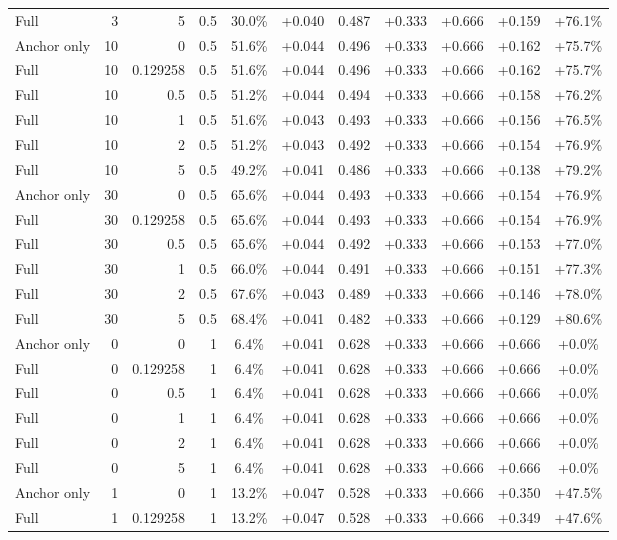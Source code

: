 \begin{table}[htbp]
\begin{tabular}{lrrrccccccc}
Full & 3 & 5 & 0.5 & 30.0\% & +0.040 & 0.487 & +0.333 & +0.666 & +0.159 & +76.1\% \\
Anchor only & 10 & 0 & 0.5 & 51.6\% & +0.044 & 0.496 & +0.333 & +0.666 & +0.162 & +75.7\% \\
Full & 10 & 0.129258 & 0.5 & 51.6\% & +0.044 & 0.496 & +0.333 & +0.666 & +0.162 & +75.7\% \\
Full & 10 & 0.5 & 0.5 & 51.2\% & +0.044 & 0.494 & +0.333 & +0.666 & +0.158 & +76.2\% \\
Full & 10 & 1 & 0.5 & 51.6\% & +0.043 & 0.493 & +0.333 & +0.666 & +0.156 & +76.5\% \\
Full & 10 & 2 & 0.5 & 51.2\% & +0.043 & 0.492 & +0.333 & +0.666 & +0.154 & +76.9\% \\
Full & 10 & 5 & 0.5 & 49.2\% & +0.041 & 0.486 & +0.333 & +0.666 & +0.138 & +79.2\% \\
Anchor only & 30 & 0 & 0.5 & 65.6\% & +0.044 & 0.493 & +0.333 & +0.666 & +0.154 & +76.9\% \\
Full & 30 & 0.129258 & 0.5 & 65.6\% & +0.044 & 0.493 & +0.333 & +0.666 & +0.154 & +76.9\% \\
Full & 30 & 0.5 & 0.5 & 65.6\% & +0.044 & 0.492 & +0.333 & +0.666 & +0.153 & +77.0\% \\
Full & 30 & 1 & 0.5 & 66.0\% & +0.044 & 0.491 & +0.333 & +0.666 & +0.151 & +77.3\% \\
Full & 30 & 2 & 0.5 & 67.6\% & +0.043 & 0.489 & +0.333 & +0.666 & +0.146 & +78.0\% \\
Full & 30 & 5 & 0.5 & 68.4\% & +0.041 & 0.482 & +0.333 & +0.666 & +0.129 & +80.6\% \\
Anchor only & 0 & 0 & 1 & 6.4\% & +0.041 & 0.628 & +0.333 & +0.666 & +0.666 & +0.0\% \\
Full & 0 & 0.129258 & 1 & 6.4\% & +0.041 & 0.628 & +0.333 & +0.666 & +0.666 & +0.0\% \\
Full & 0 & 0.5 & 1 & 6.4\% & +0.041 & 0.628 & +0.333 & +0.666 & +0.666 & +0.0\% \\
Full & 0 & 1 & 1 & 6.4\% & +0.041 & 0.628 & +0.333 & +0.666 & +0.666 & +0.0\% \\
Full & 0 & 2 & 1 & 6.4\% & +0.041 & 0.628 & +0.333 & +0.666 & +0.666 & +0.0\% \\
Full & 0 & 5 & 1 & 6.4\% & +0.041 & 0.628 & +0.333 & +0.666 & +0.666 & +0.0\% \\
Anchor only & 1 & 0 & 1 & 13.2\% & +0.047 & 0.528 & +0.333 & +0.666 & +0.350 & +47.5\% \\
Full & 1 & 0.129258 & 1 & 13.2\% & +0.047 & 0.528 & +0.333 & +0.666 & +0.349 & +47.6\% \\

\end{tabular}
\end{table}
